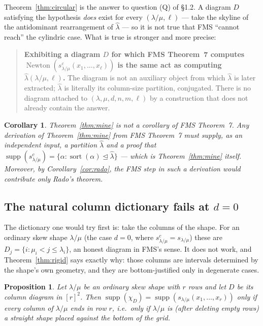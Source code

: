\documentclass[11pt]{article}
\newtheorem{prop}[thm]{Proposition}
\newtheorem{cor}[thm]{Corollary}
\theoremstyle{definition}
\DeclareMathOperator{\supp}{supp}
\DeclareMathOperator{\Newton}{Newton}
\DeclareMathOperator{\sort}{sort}
\begin{document}
Theorem~\ref{thm:circular} is the answer to question (Q) of \S1.2. A diagram $D$ satisfying the
hypothesis \emph{does} exist for every $(\lambda/\mu,\ell)$ --- take the skyline of the
antidominant rearrangement of $\hat\lambda$ --- so it is not true that FMS ``cannot reach'' the
cylindric case. What is true is stronger and more precise:

\begin{quote}
\textbf{Exhibiting a diagram $D$ for which FMS Theorem~7 computes
$\Newton(s^c_{\lambda/\mu}(x_1,\dots,x_\ell))$ is the same act as computing
$\hat\lambda(\lambda/\mu,\ell)$.} The diagram is not an auxiliary object from which
$\hat\lambda$ is later extracted; $\hat\lambda$ is literally its column-size partition,
conjugated. There is no diagram attached to $(\lambda,\mu,d,n,m,\ell)$ by a construction that
does not already contain the answer.
\end{quote}

\begin{cor}
Theorem~\ref{thm:mine} is not a corollary of FMS Theorem~7. Any derivation of
Theorem~\ref{thm:mine} from FMS Theorem~7 must supply, as an independent input, a partition
$\hat\lambda$ and a proof that $\supp(s^c_{\lambda/\mu})=\{\alpha:\sort(\alpha)\trianglelefteq
\hat\lambda\}$ --- which is Theorem~\ref{thm:mine} itself. Moreover, by
Corollary~\ref{cor:rado}, the FMS step in such a derivation would contribute only Rado's
theorem.
\end{cor}

\subsection{The natural column dictionary fails at $d=0$}

The dictionary one would try first is: take the columns of the shape. For an ordinary skew shape
$\lambda/\mu$ (the case $d=0$, where $s^c_{\lambda/\mu}=s_{\lambda/\mu}$) these are
$D_j=\{i:\mu_i<j\le\lambda_i\}$, an honest diagram in FMS's sense. It does not work, and
Theorem~\ref{thm:rigid} says exactly why: those columns are intervals determined by the shape's
own geometry, and they are bottom-justified only in degenerate cases.

\begin{prop}\label{prop:d0}
Let $\lambda/\mu$ be an ordinary skew shape with $r$ rows and let $D$ be its column diagram in
$[r]^2$. Then $\supp(\chi_D)=\supp(s_{\lambda/\mu}(x_1,\dots,x_r))$ only if every column of
$\lambda/\mu$ ends in row $r$, i.e.\ only if $\lambda/\mu$ is (after deleting empty rows) a
straight shape placed against the bottom of the grid.
\end{prop}
\end{document}
